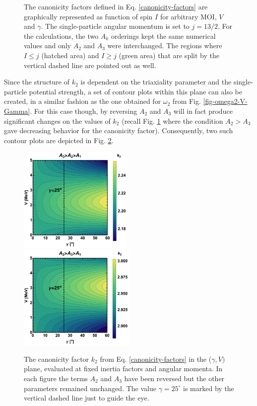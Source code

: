 \begin{figure}
    \caption{The canonicity factors defined in Eq. \ref{canonicity-factors} are graphically represented as function of spin $I$ for arbitrary MOI, $V$ and $\gamma$. The single-particle angular momentum is set to $j=13/2$. For the calculations, the two $A_k$ orderings kept the same numerical values and only $A_2$ and $A_3$ were interchanged. The regions where $I\leq j$ (hatched area) and $I\geq j$ (green area) that are split by the vertical dashed line are pointed out as well.}
    \label{fig-k-1-2-factors}
\end{figure}

Since the structure of $k_2$ is dependent on the triaxiality parameter and the single-particle potential strength, a set of contour plots within this plane can also be created, in a similar fashion as the one obtained for $\omega_2$ from Fig. \ref{fig-omega2-V-Gamma}. For this case though, by reversing $A_2$ and $A_3$ will in fact produce significant changes on the values of $k_2$ (recall Fig. \ref{fig-k-1-2-factors} where the condition $A_2>A_3$ gave decreasing behavior for the canonicity factor). Consequently, two such contour plots are depicted in Fig. \ref{fig-k2-factor-contour}.
\begin{figure}
    \centering
    \includegraphics[width=0.49\textwidth]{Chapters/Figures/k2_CP.pdf}
    \includegraphics[width=0.5\textwidth]{Chapters/Figures/k2_reversed_CP.pdf}
    \caption{The canonicity factor $k_2$ from Eq. \ref{canonicity-factors} in the ($\gamma,V)$ plane, evaluated at fixed inertia factors and angular momenta. In each figure the terms $A_2$ and $A_3$ have been reversed but the other parameters remained unchanged. The value $\gamma=25^\circ$ is marked by the vertical dashed line just to guide the eye.}
    \label{fig-k2-factor-contour}
\end{figure}

